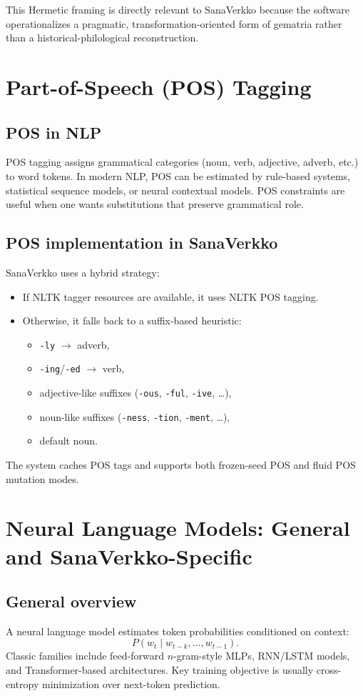 \documentclass[11pt,a4paper]{report}
\begin{document}
This Hermetic framing is directly relevant to SanaVerkko because the software operationalizes a pragmatic, transformation-oriented form of gematria rather than a historical-philological reconstruction.

\chapter{Part-of-Speech (POS) Tagging}
\section{POS in NLP}
POS tagging assigns grammatical categories (noun, verb, adjective, adverb, etc.) to word tokens. In modern NLP, POS can be estimated by rule-based systems, statistical sequence models, or neural contextual models. POS constraints are useful when one wants substitutions that preserve grammatical role.

\section{POS implementation in SanaVerkko}
SanaVerkko uses a hybrid strategy:
\begin{itemize}
  \item If NLTK tagger resources are available, it uses NLTK POS tagging.
  \item Otherwise, it falls back to a suffix-based heuristic:
  \begin{itemize}
    \item \texttt{-ly} $\rightarrow$ adverb,
    \item \texttt{-ing}/\texttt{-ed} $\rightarrow$ verb,
    \item adjective-like suffixes (\texttt{-ous}, \texttt{-ful}, \texttt{-ive}, \dots),
    \item noun-like suffixes (\texttt{-ness}, \texttt{-tion}, \texttt{-ment}, \dots),
    \item default noun.
  \end{itemize}
\end{itemize}

The system caches POS tags and supports both frozen-seed POS and fluid POS mutation modes.

\chapter{Neural Language Models: General and SanaVerkko-Specific}
\section{General overview}
A neural language model estimates token probabilities conditioned on context:
\[
P(w_t\mid w_{t-k},\dots,w_{t-1}).
\]
Classic families include feed-forward $n$-gram-style MLPs, RNN/LSTM models, and Transformer-based architectures. Key training objective is usually cross-entropy minimization over next-token prediction.
\end{document}
